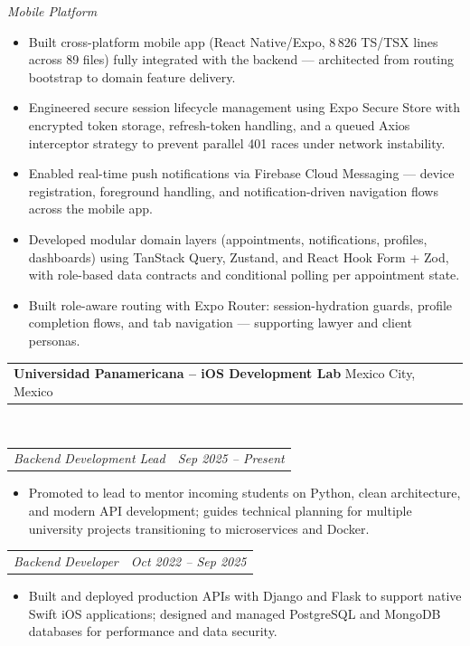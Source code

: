 \documentclass[11pt, letterpaper]{article}
\makeatletter
\newcommand{\entry}[2]{%
  \noindent\begin{tabular*}{\textwidth}{@{}l@{\extracolsep{\fill}}r@{}}
    #1 & #2
  \end{tabular*}}
\newenvironment{cvlist}{%
  \begin{itemize}[leftmargin=1.4em,itemsep=1.5pt,topsep=3pt,parsep=0pt]
}{\end{itemize}}
\makeatother
\begin{document}
\vspace{5pt}
\textit{Mobile Platform}
\begin{cvlist}
  \item Built cross-platform mobile app (React Native/Expo, 8\,826 TS/TSX lines across
        89 files) fully integrated with the backend — architected from routing bootstrap
        to domain feature delivery.
  \item Engineered secure session lifecycle management using Expo Secure Store with
        encrypted token storage, refresh-token handling, and a queued Axios interceptor
        strategy to prevent parallel 401 races under network instability.
  \item Enabled real-time push notifications via Firebase Cloud Messaging — device
        registration, foreground handling, and notification-driven navigation flows
        across the mobile app.
  \item Developed modular domain layers (appointments, notifications, profiles,
        dashboards) using TanStack Query, Zustand, and React Hook Form + Zod,
        with role-based data contracts and conditional polling per appointment state.
  \item Built role-aware routing with Expo Router: session-hydration guards, profile
        completion flows, and tab navigation — supporting lawyer and client personas.
\end{cvlist}

\bigskip

\entry{\textbf{Universidad Panamericana -- iOS Development Lab} \quad Mexico City, Mexico}{}\\
\entry{\textit{Backend Development Lead}}{\textit{Sep 2025 -- Present}}

\begin{cvlist}
  \item Promoted to lead to mentor incoming students on Python, clean architecture,
        and modern API development; guides technical planning for multiple university
        projects transitioning to microservices and Docker.
\end{cvlist}

\vspace{3pt}
\entry{\textit{Backend Developer}}{\textit{Oct 2022 -- Sep 2025}}

\begin{cvlist}
  \item Built and deployed production APIs with Django and Flask to support native
        Swift iOS applications; designed and managed PostgreSQL and MongoDB databases
        for performance and data security.
\end{cvlist}
\end{document}
